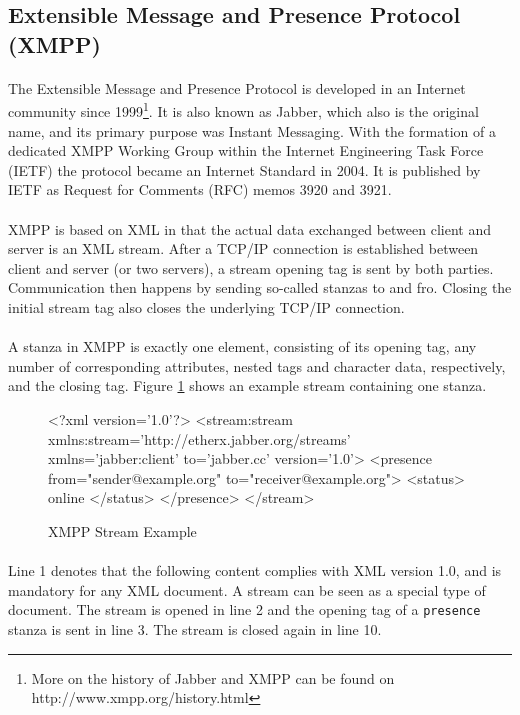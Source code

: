 \subsection{Extensible Message and Presence Protocol (XMPP)}
\label{sec:xmpp}
\paragraph{}
The Extensible Message and Presence Protocol is developed in an Internet community since 1999\footnote{More on the history of Jabber and XMPP can be found on http://www.xmpp.org/\-history.html}. It is also known as Jabber, which also is the original name, and its primary purpose was Instant Messaging. With the formation of a dedicated XMPP Working Group within the Internet Engineering Task Force (IETF) the protocol became an Internet Standard in 2004. It is published by IETF as Request for Comments (RFC) memos 3920 and 3921.
\paragraph{}
XMPP is based on XML in that the actual data exchanged between client and server is an XML stream. After a TCP/IP connection is established between client and server (or two servers), a stream opening tag is sent by both parties. Communication then happens by sending so-called stanzas to and fro. Closing the initial stream tag also closes the underlying TCP/IP connection.
\paragraph{}
A stanza in XMPP is exactly one element, consisting of its opening tag, any number of corresponding attributes, nested tags and character data, respectively, and the closing tag. Figure \ref{fig:streamExample} shows an example stream containing one stanza.

\begin{figure}[H]
\begin{listing}{1}
<?xml version='1.0'?>
<stream:stream 
      xmlns:stream='http://etherx.jabber.org/streams' 
      xmlns='jabber:client' to='jabber.cc' version='1.0'>
  <presence from="sender@example.org" to="receiver@example.org">
    <status>
      online
    </status>
  </presence>
</stream>
\end{listing}
\caption{XMPP Stream Example}
\label{fig:streamExample}
\end{figure}

\paragraph{}
Line 1 denotes that the following content complies with XML version 1.0, and is mandatory for any XML document. A stream can be seen as a special type of document. The stream is opened in line 2 and the opening tag of a \texttt{presence} stanza is sent in line 3. The stream is closed again in line 10.
